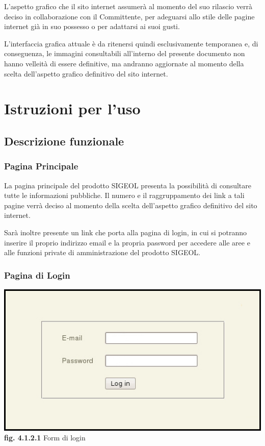 \documentclass[11pt,a4paper]{article}
\begin{document}
L'aspetto grafico che il sito internet assumerà al momento del suo rilascio verrà deciso in collaborazione con il Committente, per adeguarsi allo stile delle pagine internet già in suo possesso o per adattarsi ai suoi gusti.

L'interfaccia grafica attuale è da ritenersi quindi esclusivamente temporanea e, di conseguenza, le immagini consultabili all'interno del presente documento non hanno velleità di essere definitive, ma andranno aggiornate al momento della scelta dell'aspetto grafico definitivo del sito internet.
\section{Istruzioni per l'uso}
\subsection{Descrizione funzionale}
\subsubsection{Pagina Principale}
La pagina principale del prodotto SIGEOL presenta la possibilità di consultare tutte le informazioni pubbliche. Il numero e il raggruppamento dei link a tali pagine verrà deciso al momento della scelta dell'aspetto grafico definitivo del sito internet.

Sarà inoltre presente un link che porta alla pagina di login, in cui si potranno inserire il proprio indirizzo email e la propria password per accedere alle aree e alle funzioni private di amministrazione del prodotto SIGEOL.
\subsubsection{Pagina di Login}

\begin{center}
	\includegraphics[scale=0.5]{images/login.jpg}\\
	\textbf{fig. 4.1.2.1} Form di login\\
\end{center}
\end{document}
